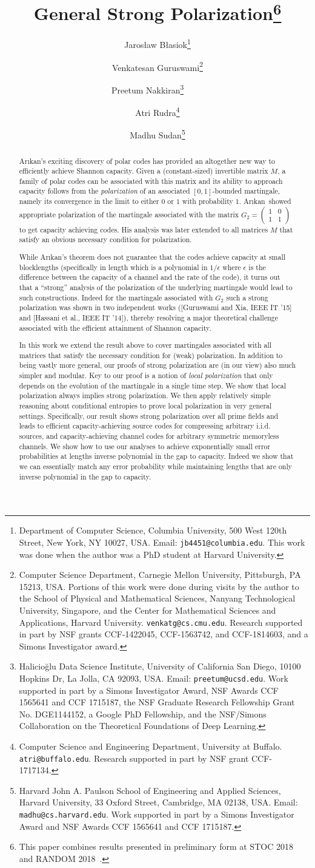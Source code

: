 \documentclass[11pt]{article}
\title{\textbf{General Strong Polarization}\thanks{This paper combines results presented in preliminary form at STOC 2018~\cite{BGNRS18-conf} and RANDOM 2018~\cite{BGS18-conf}.}}
\author{%
Jaros\l aw B\l asiok\thanks{ Department of Computer Science, Columbia University, 500 West 120th Street,
New York, NY 10027, USA. Email: {\tt jb4451@columbia.edu}. This work was done when the author was a PhD student at Harvard University.}%
\and Venkatesan Guruswami\thanks{Computer Science Department, Carnegie Mellon University, Pittsburgh, PA 15213, USA. Portions of this work were done during visits by the author to the School of Physical and Mathematical Sciences, Nanyang Technological University, Singapore, and the Center for Mathematical Sciences and Applications, Harvard University. {\tt venkatg@cs.cmu.edu}. Research supported in part by NSF grants CCF-1422045, CCF-1563742, and CCF-1814603, and a Simons Investigator award.}
\and Preetum Nakkiran\thanks{
Halicioğlu Data Science Institute,
University of California San Diego,
10100 Hopkins Dr, La Jolla, CA 92093, USA.
Email: {\tt preetum@ucsd.edu}.
Work supported in part by a Simons Investigator Award, NSF Awards CCF 1565641
and CCF 1715187, the NSF Graduate Research Fellowship Grant No. DGE1144152, a Google PhD Fellowship, and the NSF/Simons Collaboration on the Theoretical Foundations of Deep Learning.} $\qquad$ 
\and Atri Rudra\thanks{Computer Science and Engineering Department, University at Buffalo. {\tt atri@buffalo.edu}. Research supported in part by NSF grant CCF-1717134.}
\and Madhu Sudan\thanks{Harvard John A. Paulson School of Engineering and Applied Sciences, Harvard University, 33 Oxford Street,
Cambridge, MA 02138, USA. Email: {\tt madhu@cs.harvard.edu}. Work supported in part by a Simons Investigator Award and NSF Awards CCF 1565641 and CCF 1715187.}
}
\date{}
\newcommand{\Arikan}{Ar\i kan}
\begin{document}
\maketitle

\thispagestyle{empty}

\vspace{-0.5cm}
\begin{abstract}



\Arikan's exciting discovery of polar codes has provided an altogether new way to efficiently achieve Shannon capacity. Given a (constant-sized) invertible matrix $M$, a family of polar codes can be associated with this matrix and its ability to approach capacity follows from the {\em polarization} of an associated $[0,1]$-bounded martingale, namely its convergence in the limit to either $0$ or $1$ with probability $1$. \Arikan\ showed appropriate polarization of the martingale associated with the matrix $G_2 = \left( \begin{smallmatrix} 1 & 0 \\ 1 & 1 \end{smallmatrix} \right)$ to get capacity achieving codes. His analysis was later extended to all matrices $M$ that satisfy an obvious necessary condition for polarization.

\smallskip
While \Arikan's theorem does not guarantee that the codes achieve capacity at small blocklengths (specifically in length which is a polynomial in $1/\epsilon$ where $\epsilon$ is the difference between the capacity of a channel and the rate of the code), it turns out that a ``strong'' analysis of the polarization of the underlying martingale would lead to such constructions. Indeed for the martingale associated with $G_2$ such a strong polarization was shown in two independent works ([Guruswami and Xia, IEEE IT '15] and [Hassani et al., IEEE IT '14]), thereby resolving a major theoretical challenge associated with the efficient attainment of Shannon capacity.

\smallskip
In this work we extend the result above to cover martingales associated with all matrices that satisfy the necessary condition for (weak) polarization.
In addition to being vastly more general, our proofs of strong polarization are (in our view) also much simpler and modular. Key to our proof is a notion of {\em local polarization} that only depends on the evolution of the martingale in a single time step. We show that local polarization always implies strong polarization. We then apply relatively simple reasoning about conditional entropies to prove local polarization in very general settings.
Specifically, our result shows strong polarization over all prime fields and leads to efficient capacity-achieving source codes for compressing arbitrary i.i.d. sources, and capacity-achieving channel codes for arbitrary symmetric memoryless channels. We show how to use our analyses to achieve exponentially small error probabilities at lengths inverse polynomial in the gap to capacity. Indeed we show that we can essentially match any error probability while maintaining lengths that are only inverse polynomial in the gap to capacity. 




\end{abstract}
\end{document}
